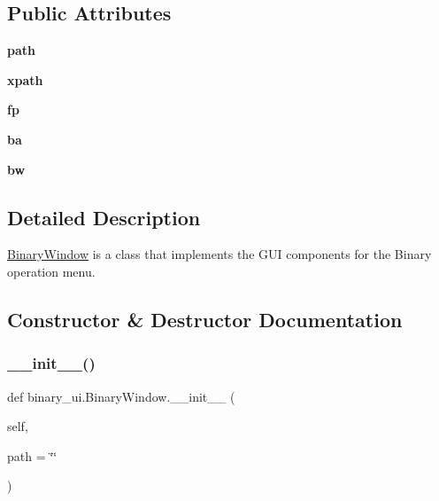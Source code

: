 \subsection*{Public Attributes}
\begin{DoxyCompactItemize}
\item 
\mbox{\label{classbinary__ui_1_1_binary_window_a503e75da778a99d49bb4e881104c51c8}} 
{\bfseries path}
\item 
\mbox{\label{classbinary__ui_1_1_binary_window_a1eb2477c8aef7283a71a03fec0d227fa}} 
{\bfseries xpath}
\item 
\mbox{\label{classbinary__ui_1_1_binary_window_a35f478bed69ae16b900d8a68439f2ee2}} 
{\bfseries fp}
\item 
\mbox{\label{classbinary__ui_1_1_binary_window_a43cd237b6ac8533d8996144e687877cf}} 
{\bfseries ba}
\item 
\mbox{\label{classbinary__ui_1_1_binary_window_a7904b3d4e6281944838e25000b3ba0e6}} 
{\bfseries bw}
\end{DoxyCompactItemize}


\subsection{Detailed Description}
\hyperlink{classbinary__ui_1_1_binary_window}{Binary\+Window} is a class that implements the G\+UI components for the Binary operation menu. 

\subsection{Constructor \& Destructor Documentation}
\mbox{\label{classbinary__ui_1_1_binary_window_a2bc9146b516f338d24aa00087b8736bf}} 
\subsubsection{\texorpdfstring{\+\_\+\+\_\+init\+\_\+\+\_\+()}{\_\_init\_\_()}}
{\footnotesize\ttfamily def binary\+\_\+ui.\+Binary\+Window.\+\_\+\+\_\+init\+\_\+\+\_\+ (\begin{DoxyParamCaption}\item[{}]{self,  }\item[{}]{path = {\ttfamily \char`\"{}\char`\"{}} }\end{DoxyParamCaption})}



